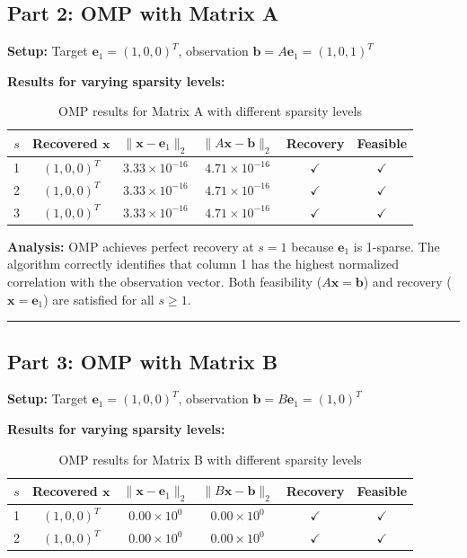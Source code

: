 \clearpage
\subsection*{Part 2: OMP with Matrix A}

\textbf{Setup:} Target $\mathbf{e}_1 = (1, 0, 0)^T$, observation $\mathbf{b} = A\mathbf{e}_1 = (1, 0, 1)^T$

\textbf{Results for varying sparsity levels:}

\begin{table}[h]
\centering
\begin{tabular}{cccccc}
\toprule
$s$ & Recovered $\mathbf{x}$ & $\|\mathbf{x} - \mathbf{e}_1\|_2$ & $\|A\mathbf{x} - \mathbf{b}\|_2$ & Recovery & Feasible \\
\midrule
1 & $(1, 0, 0)^T$ & $3.33 \times 10^{-16}$ & $4.71 \times 10^{-16}$ & $\checkmark$ & $\checkmark$ \\
2 & $(1, 0, 0)^T$ & $3.33 \times 10^{-16}$ & $4.71 \times 10^{-16}$ & $\checkmark$ & $\checkmark$ \\
3 & $(1, 0, 0)^T$ & $3.33 \times 10^{-16}$ & $4.71 \times 10^{-16}$ & $\checkmark$ & $\checkmark$ \\
\bottomrule
\end{tabular}
\caption{OMP results for Matrix A with different sparsity levels}
\end{table}

\textbf{Analysis:} OMP achieves perfect recovery at $s=1$ because $\mathbf{e}_1$ is 1-sparse. The algorithm correctly identifies that column 1 has the highest normalized correlation with the observation vector. Both feasibility ($A\mathbf{x} = \mathbf{b}$) and recovery ($\mathbf{x} = \mathbf{e}_1$) are satisfied for all $s \geq 1$.

\vspace{2em}
\noindent\rule{\textwidth}{0.4pt}

\clearpage
\subsection*{Part 3: OMP with Matrix B}

\textbf{Setup:} Target $\mathbf{e}_1 = (1, 0, 0)^T$, observation $\mathbf{b} = B\mathbf{e}_1 = (1, 0)^T$

\textbf{Results for varying sparsity levels:}

\begin{table}[h]
\centering
\begin{tabular}{cccccc}
\toprule
$s$ & Recovered $\mathbf{x}$ & $\|\mathbf{x} - \mathbf{e}_1\|_2$ & $\|B\mathbf{x} - \mathbf{b}\|_2$ & Recovery & Feasible \\
\midrule
1 & $(1, 0, 0)^T$ & $0.00 \times 10^{0}$ & $0.00 \times 10^{0}$ & $\checkmark$ & $\checkmark$ \\
2 & $(1, 0, 0)^T$ & $0.00 \times 10^{0}$ & $0.00 \times 10^{0}$ & $\checkmark$ & $\checkmark$ \\
\bottomrule
\end{tabular}
\caption{OMP results for Matrix B with different sparsity levels}
\end{table}

